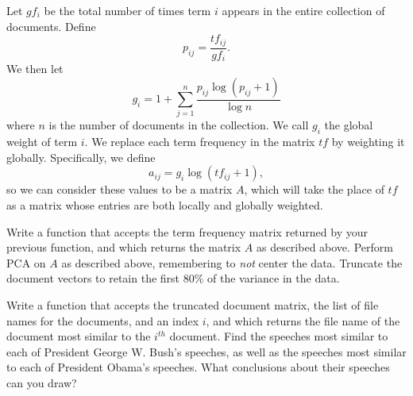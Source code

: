 Let $g\!f_{i}$ be the total number of times term $i$ appears in the entire collection of documents. Define $$p_{ij} = \frac{t\!f_{ij}}{g\!f_{i}}.$$ We then let $$g_{i} = 1 + \sum_{j=1}^{n} \frac{p_{ij} \log (p_{ij} + 1)}{\log n}$$ where $n$ is the number of documents in the collection. We call $g_{i}$ the global weight of term $i$. We replace each term frequency in the matrix $tf$ by weighting it globally. Specifically, we define $$a_{ij} = g_{i} \log (t\!f_{ij} + 1),$$ so we can consider these values to be a matrix $A$, which will take the place of $tf$ as a matrix whose entries are both locally and globally weighted.

\begin{problem}
Write a function that accepts the term frequency matrix returned by your previous function, and which returns the matrix $A$ as described above. Perform PCA on $A$ as described above, remembering to \emph{not} center the data. Truncate the document vectors to retain the first $80\%$ of the variance in the data.
\end{problem}

\begin{problem}
Write a function that accepts the truncated document matrix, the list of file names for the documents, and an index $i$, and which returns the file name of the document most similar to the $i^{th}$ document. Find the speeches most similar to each of President George W. Bush's speeches, as well as the speeches most similar to each of President Obama's speeches. What conclusions about their speeches can you draw?
\end{problem}

